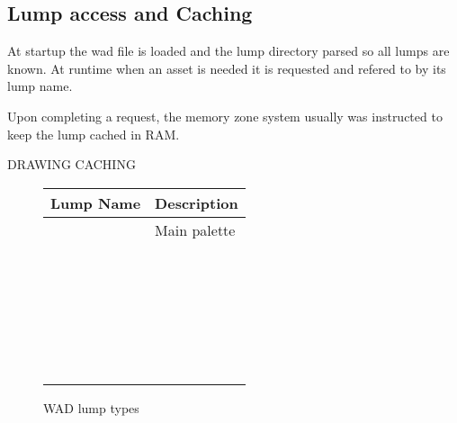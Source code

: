 \subsection{Lump access and Caching}
At startup the wad file is loaded and the lump directory parsed so all lumps are known. At runtime when an asset is needed it is requested and refered to by its lump name.\\
\par
{}
\par
 Upon completing a request, the memory zone system usually was instructed to keep the lump cached in RAM.\\
\par
DRAWING CACHING\\
\par
\begin{figure}[H]
\centering  
\begin{tabularx}{\textwidth}{ L{0.2}  L{0.8}}
  \toprule
  \textbf{Lump Name} &  \textbf{Description} \\
   
  \toprule 
   & Main palette \\
   &  \\
   &  \\
  \toprule
   &  \\
   &  \\
   &  \\
   &  \\
   &  \\
   &  \\
   &  \\
   &  \\
   &  \\
   &  \\
   &  \\
  \toprule
   &  \\
   &  \\
   &  \\
  \toprule
   &  \\
   &  \\
   &  \\
   &  \\
   &  \\  
   &  \\  
   &  \\  
   &  \\  
   &  \\  
   &  \\  
   \toprule
\end{tabularx}
\caption{WAD lump types}
\end{figure}
\par


